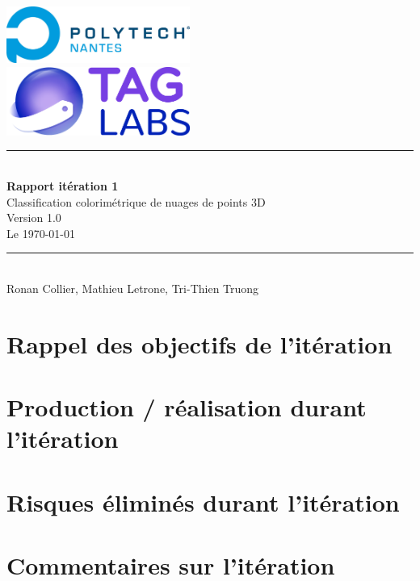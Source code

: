 \documentclass[12pt,titlepage,french]{article}
\begin{document}

\begin{titlepage}
\newcommand{\HRule}{\rule{\linewidth}{0.5mm}}
\center

  \includegraphics[width=0.45\textwidth]{../../ressources/img_logos/logo_polytech.png}\\[1cm]
   
  \includegraphics[width=0.45\textwidth]{../../ressources/img_logos/logo_taglabs.png}


\HRule \\[0.4cm]
{ \huge \bfseries Rapport itération 1\\[0.15cm] }
Classification colorimétrique de nuages de points 3D\\
Version 1.0\\
Le \today \\
\HRule \\[1.5cm]
Ronan Collier,
Mathieu Letrone,
Tri-Thien Truong
\\[1cm]
\end{titlepage}

\tableofcontents %
\newpage

\section{Rappel des objectifs de l'itération}


\section{Production / réalisation durant l'itération}


\section{Risques éliminés durant l'itération}


\section{Commentaires sur l'itération}
\end{document}
